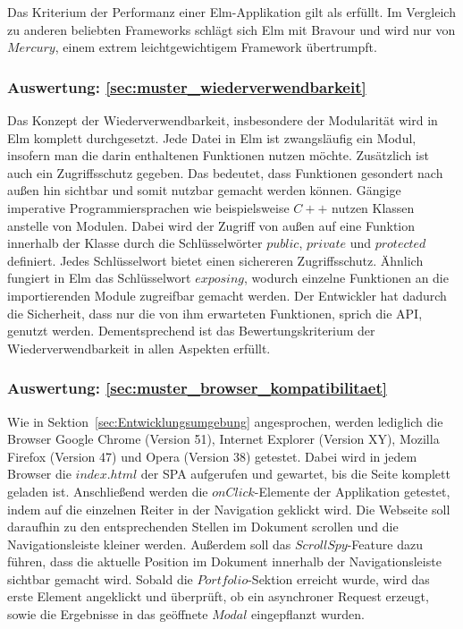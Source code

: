 Das Kriterium der Performanz einer Elm-Applikation gilt als erfüllt. Im Vergleich zu anderen beliebten Frameworks schlägt sich Elm mit Bravour und wird nur von $Mercury$, einem extrem leichtgewichtigem Framework übertrumpft.

\subsubsection{Auswertung: \ref{sec:muster_wiederverwendbarkeit} }
Das Konzept der Wiederverwendbarkeit, insbesondere der Modularität wird in Elm komplett durchgesetzt. Jede Datei in Elm ist zwangsläufig ein Modul, insofern man die darin enthaltenen Funktionen nutzen möchte. Zusätzlich ist auch ein Zugriffsschutz gegeben. Das bedeutet, dass Funktionen gesondert nach außen hin sichtbar und somit nutzbar gemacht werden können. Gängige imperative Programmiersprachen wie beispielsweise $C++$ nutzen Klassen anstelle von Modulen. Dabei wird der Zugriff von außen auf eine Funktion innerhalb der Klasse durch die Schlüsselwörter $public$, $private$ und $protected$ definiert. Jedes Schlüsselwort bietet einen sichereren Zugriffsschutz. Ähnlich fungiert in Elm das Schlüsselwort $exposing$, wodurch einzelne Funktionen an die importierenden Module zugreifbar gemacht werden. Der Entwickler hat dadurch die Sicherheit, dass nur die von ihm erwarteten Funktionen, sprich die \ac{API}, genutzt werden. Dementsprechend ist das Bewertungskriterium der Wiederverwendbarkeit in allen Aspekten erfüllt.


\subsubsection{Auswertung: \ref{sec:muster_browser_kompatibilitaet} }
Wie in Sektion~\ref{sec:Entwicklungsumgebung} angesprochen, werden lediglich die Browser Google Chrome (Version 51), Internet Explorer (Version XY), Mozilla Firefox (Version 47) und Opera (Version 38) getestet. Dabei wird in jedem Browser die $index.html$ der \ac{SPA} aufgerufen und gewartet, bis die Seite komplett geladen ist. Anschließend werden die $onClick$-Elemente der Applikation getestet, indem auf die einzelnen Reiter in der Navigation geklickt wird. Die Webseite soll daraufhin zu den entsprechenden Stellen im Dokument scrollen und die Navigationsleiste kleiner werden. Außerdem soll das $ScrollSpy$-Feature dazu führen, dass die aktuelle Position im Dokument innerhalb der Navigationsleiste sichtbar gemacht wird. Sobald die $Portfolio$-Sektion erreicht wurde, wird das erste Element angeklickt und überprüft, ob ein asynchroner Request erzeugt, sowie die Ergebnisse in das geöffnete $Modal$ eingepflanzt wurden.

